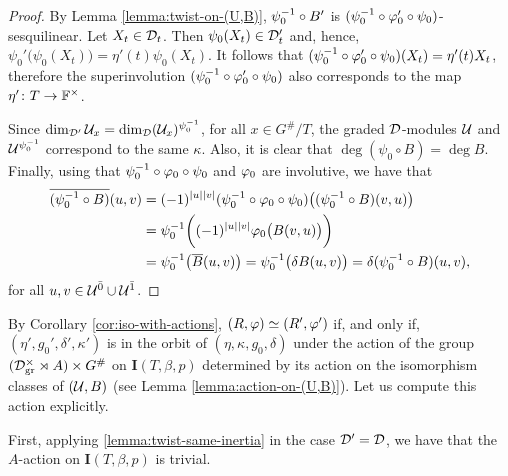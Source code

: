\begin{proof}
	By Lemma \ref{lemma:twist-on-(U,B)}, $\psi_0^{-1} \circ B'$ is $(\psi_0^{-1} \circ \varphi_0' \circ \psi_0)$-sesquilinear.
	Let $X_t \in \mathcal{D}_t$.
	Then $\psi_0 (X_t)\in \mathcal{D}_t'$ and, hence, $\psi_0' \big(\psi_0 (X_t) \big) = \eta' (t) \psi_0 (X_t)$.
	It follows that $(\psi_0^{-1} \circ \varphi_0' \circ \psi_0) (X_t) = \eta'(t) X_t$, therefore the superinvolution $(\psi_0^{-1} \circ \varphi_0' \circ \psi_0)$ also corresponds to the map $\eta'\colon T \to \mathbb{F}^\times$.

	Since $\dim_{\mathcal{D}'} \mathcal U_x = \dim_{\mathcal{D}} (\mathcal U_x)^{\psi_0^{-1}}$, for all $x \in G^\#/T$, the graded $\mathcal{D}$-modules $\mathcal U$ and $\mathcal U^{\psi_0^{-1}}$ correspond to the same $\kappa$.
	Also, it is clear that $\deg (\psi_0 \circ B) = \deg B$. Finally, using that $\psi_0^{-1} \circ \varphi_0 \circ \psi_0$ and $\varphi_0$ are involutive, we have that
	\begin{align*}
		\overline{(\psi_0^{-1} \circ B)} (u,v) & = (-1)^{|u||v|} (\psi_0^{-1} \circ \varphi_0 \circ \psi_0) \big( (\psi_0^{-1} \circ B)(v, u) \big)                            \\
		                                      & = \psi_0^{-1} \bigg( (-1)^{|u||v|} \varphi_0 \big( B(v,u) \big) \bigg)                                                       \\
		                                      & = \psi_0^{-1} \big( \overline B (u,v) \big) = \psi_0^{-1} \big( \delta B (u,v) \big) = \delta (\psi_0^{-1} \circ B) (u,v),
	\end{align*}
	for all $u, v \in \mathcal U^{\bar0} \cup \mathcal U^{\bar1}$.
\end{proof}

By Corollary \ref{cor:iso-with-actions}, $(R, \varphi) \simeq (R', \varphi')$ if, and only if, $(\eta', g_0', \delta', \kappa')$ is in the orbit of $(\eta, \kappa, g_0, \delta)$ under the action of the group $(\mathcal{D}^\times_{\mathrm{gr}} \rtimes A ) \times G^\#$ on $\mathbf{I}(T, \beta, p)$ determined by its action on the isomorphism classes of $(\mathcal U, B)$ (see Lemma \ref{lemma:action-on-(U,B)}).
Let us compute this action explicitly.

First, applying \cref{lemma:twist-same-inertia} in the case $\mathcal{D}' = \mathcal{D}$, we have that the $A$-action on $\mathbf{I}(T, \beta, p)$ is trivial.

